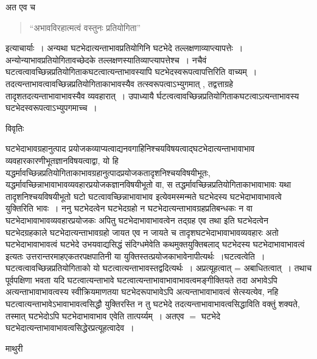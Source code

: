 \documentclass[10pt, openany]{book}
\begin{document}
{{\la अत एव च 
\begin{quote}
    \vp
``अभावविरहात्मत्वं वस्तुनः प्रतियोगिता'' 
\end{quote}
इत्याचार्याः~। अन्यथा घटभेदात्यन्ताभावप्रतियोगिनि घटभेदे  तल्लक्षणाव्याप्त्यापत्तेः~। अन्योन्याभावप्रतियोगितावच्छेदके तल्लक्षणस्यातिव्याप्त्यापत्तेश्च~। नचैवं घटत्वत्वावच्छिन्नप्रतियोगिताकघटत्वात्यन्ताभावस्यापि घटभेदस्वरूपत्वापत्तिरिति वाच्यम्~। तदत्यन्ताभावत्वावच्छिन्नप्रतियोगिताकाभावस्यैव तत्स्वरूपत्वाऽभ्युगमात् , तद्वत्ताग्रहे तादृशतदत्यन्ताभावाभावस्यैव व्यवहारात्~। {\vpc उपाध्यायै} र्घटत्वत्वावच्छिन्नप्रतियोगिताकघटत्वाऽत्यन्ताभावस्य  घटभेदस्वरूपत्वाऽभ्युपगमाच्च~।~}
\begin{center}     विवृतिः \end{center}
घटभेदाभावग्रहानुत्पाद प्रयोजकव्याप्यत्वाद्यनवगाहिनिश्चयविषयत्वाद्घटभेदात्यन्ताभावाभाव व्यवहारकारणीभूतज्ञानविषयत्वाद्वा,  यो हि यद्धर्मावच्छिन्नप्रतियोगिताकाभावग्रहानुत्पादप्रयोजकतादृशनिश्चयविषयीभूतः, यद्धर्मावच्छिन्नाभावाभावव्यवहारप्रयोजकज्ञानविषयीभूतो वा, स तद्धर्मावच्छिन्नप्रतियोगिताकाभावाभावः यथा तादृशनिश्चयविषयीभूतो घटो घटत्वावच्छिन्नाभावाभाव इत्येवमस्मन्मते घटभेदस्य घटभेदाभावाभावत्वे युक्तिरिति भावः~। ननु घटभेदत्वेन घटभेदग्रहो न घटभेदात्यन्ताभावग्रहप्रतिबन्धकः न वा घटभेदाभावाभावव्यवहारप्रयोजकः अपितु घटभेदाभावाभावत्वेन तद्ग्रह एव तथा इति घटभेदत्वेन घटभेदग्रहकाले घटभेदात्यन्ताभावग्रहो जायत एव न जायते च तादृशघटभेदाभावाभावव्यवहारः अतो घटभेदाभावाभावत्वं घटभेदे उभयवाद्यसिद्धं संदिग्धमेवेति कथमुक्तयुक्तिबलाद् घटभेदस्य घटभेदाभावाभावत्वं इत्यतः उत्तरान्तरमाहएकतरपक्षपातिनी या युक्तिस्तत्प्रयोजकाभावेनापीत्यर्थः~।घटत्वत्वेति~। घटत्वत्वावच्छिन्नप्रतियोगिताको यो घटत्वात्यन्ताभावस्तद्वदित्यर्थः~। अप्रत्यूहत्वात् = अबाधितत्वात्~। तथाच पूर्वपक्षिणा भवता यदि घटत्वात्यन्ताभावे
घटत्वात्यन्ताभावाभावाभावत्वमङ्गीक्तियते तदा अभावेऽपि अत्यन्ताभावाभावत्वस्य स्वीक्रियमाणतया घटभेदरूपाभावेऽपि अत्यन्ताभावाभावत्वं सेत्स्यत्येव, नहि घटत्वात्यन्ताभावेऽभावाभावत्वसिद्धौ युक्तिरस्ति न तु घटभेदे तदत्यन्ताभावाभावत्वसिद्धाविति वक्तुं शक्यते, तस्मात् घटभेदोऽपि घटभेदाभावाभाव एवेति तात्पर्य्यम्~। अतएव $=$ घटभेदे घटभेदात्यन्ताभावाभावत्वसिद्धेरप्रत्यूहत्वादेव~।
\newpage
\begin{center}  माथुरी  \end{center}

}
\end{document}
